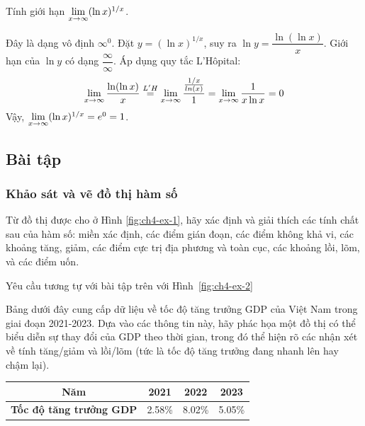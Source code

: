 \begin{example}
    Tính giới hạn $\lim\limits_{x \to \infty} (\ln x)^{1/x}$.
    \begin{solution}
    Đây là dạng vô định $\infty^0$. Đặt $y = (\ln x)^{1/x}$, suy ra $\ln y = \dfrac{\ln(\ln x)}{x}$.
    Giới hạn của $\ln y$ có dạng $\dfrac{\infty}{\infty}$. Áp dụng quy tắc L'Hôpital:
    $$ \lim\limits_{x \to \infty} \dfrac{\ln(\ln x)}{x} \overset{L'H}{=} \lim\limits_{x \to \infty} \dfrac{\frac{1/x}{ln(x)}}{1} = \lim\limits_{x \to \infty} \dfrac{1}{x \ln x} = 0 $$
    Vậy, $\lim\limits_{x \to \infty} (\ln x)^{1/x} = e^0 = 1$.
    \end{solution}
\end{example}

\subsection{Bài tập}

\subsubsection{Khảo sát và vẽ đồ thị hàm số}

\begin{exercise}
Từ đồ thị được cho ở Hình \ref{fig:ch4-ex-1}, hãy xác định và giải thích các tính chất sau của hàm số: miền xác định, các điểm gián đoạn, các điểm không khả vi, các khoảng tăng, giảm, các điểm cực trị địa phương và toàn cục, các khoảng lồi, lõm, và các điểm uốn.


\end{exercise}

\begin{exercise}
Yêu cầu tương tự với bài tập trên với Hình~\ref{fig:ch4-ex-2}

\end{exercise}

\begin{exercise}
Bảng dưới đây cung cấp dữ liệu về tốc độ tăng trưởng GDP của Việt Nam trong giai đoạn 2021-2023. Dựa vào các thông tin này, hãy phác họa một đồ thị có thể biểu diễn sự thay đổi của GDP theo thời gian, trong đó thể hiện rõ các nhận xét về tính tăng/giảm và lồi/lõm (tức là tốc độ tăng trưởng đang nhanh lên hay chậm lại).
\begin{center}
\begin{tabular}{|c|c|c|c|}
\hline
\textbf{Năm} & 2021 & 2022 & 2023 \\
\hline
\textbf{Tốc độ tăng trưởng GDP} & 2.58\% & 8.02\% & 5.05\% \\
\hline
\end{tabular}
\end{center}
\end{exercise}

